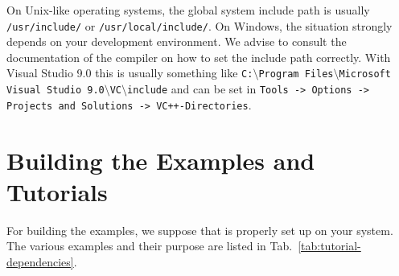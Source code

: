 On Unix-like operating systems, the global system include path is usually \lstinline|/usr/include/| or \lstinline|/usr/local/include/|.
On Windows, the situation strongly depends on your development environment. We
advise to consult the documentation of the compiler on how to set the include
path correctly. With Visual Studio 9.0 this is usually something like
\texttt{C:$\setminus$Program Files$\setminus$Microsoft Visual Studio
9.0$\setminus$VC$\setminus$include}
and can be set in \texttt{Tools -> Options -> Projects and Solutions ->
VC++-\-Directories}. 


\section{Building the Examples and Tutorials}
For building the examples, we suppose that {\CMake} is properly set up
on your system. The various examples and their purpose are listed in
Tab.~\ref{tab:tutorial-dependencies}.

